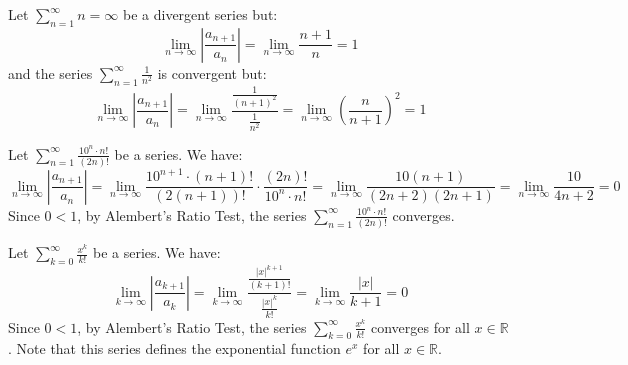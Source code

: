 \begin{eg}
    Let $\sum_{n = 1}^{\infty} n = \infty$ be a divergent series but:
    \[
        \lim_{n \to \infty} \left|\frac{a_{n + 1}}{a_n}\right| = \lim_{n \to \infty} \frac{n + 1}{n} = 1
    \]
    and the series $\sum_{n = 1}^{\infty} \frac{1}{n^2}$ is convergent but:
    \[
        \lim_{n \to \infty} \left|\frac{a_{n + 1}}{a_n}\right| = \lim_{n \to \infty} \frac{\frac{1}{(n + 1)^2}}{\frac{1}{n^2}} = \lim_{n \to \infty} \left(\frac{n}{n + 1}\right)^2 = 1
    \]
\end{eg}

\begin{eg}
    Let $\sum_{n = 1}^{\infty} \frac{10^n \cdot n!}{(2n)!}$ be a series. We have:
    \[
        \lim_{n \to \infty} \left|\frac{a_{n + 1}}{a_n}\right| = \lim_{n \to \infty} \frac{10^{n + 1} \cdot (n + 1)!}{(2(n + 1))!} \cdot \frac{(2n)!}{10^n \cdot n!} = \lim_{n \to \infty} \frac{10(n + 1)}{(2n + 2)(2n + 1)} = \lim_{n \to \infty} \frac{10}{4n + 2} = 0
    \]
    Since $0 < 1$, by Alembert's Ratio Test, the series $\sum_{n = 1}^{\infty} \frac{10^n \cdot n!}{(2n)!}$ converges.
\end{eg}

\begin{eg}
    Let $\sum_{k = 0}^{\infty} \frac{x^k}{k!}$ be a series. We have:
    \[
        \lim_{k \to \infty} \left|\frac{a_{k + 1}}{a_k}\right| = \lim_{k \to \infty} \frac{\frac{|x|^{k + 1}}{(k + 1)!}}{\frac{|x|^k}{k!}} = \lim_{k \to \infty} \frac{|x|}{k + 1} = 0
    \]
    Since $0 < 1$, by Alembert's Ratio Test, the series $\sum_{k = 0}^{\infty} \frac{x^k}{k!}$ converges for all $x \in \mathbb{R}$. Note that this series defines the exponential function $e^x$ for all $x \in \mathbb{R}$.
\end{eg}